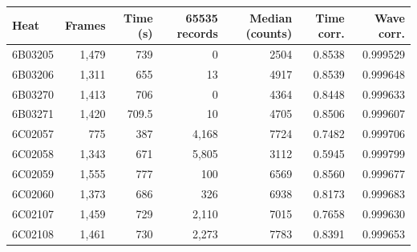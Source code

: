 \begingroup
{}
\begin{tabular}{lrrrrrr}
\toprule
Heat & Frames & Time (s) & 65535 records & Median (counts) & Time corr. & Wave corr. \\
\midrule
6B03205 & 1,479 & 739 & 0 & 2504 & 0.8538 & 0.999529 \\
6B03206 & 1,311 & 655 & 13 & 4917 & 0.8539 & 0.999648 \\
6B03270 & 1,413 & 706 & 0 & 4364 & 0.8448 & 0.999633 \\
6B03271 & 1,420 & 709.5 & 10 & 4705 & 0.8506 & 0.999607 \\
6C02057 & 775 & 387 & 4,168 & 7724 & 0.7482 & 0.999706 \\
6C02058 & 1,343 & 671 & 5,805 & 3112 & 0.5945 & 0.999799 \\
6C02059 & 1,555 & 777 & 100 & 6569 & 0.8560 & 0.999677 \\
6C02060 & 1,373 & 686 & 326 & 6938 & 0.8173 & 0.999683 \\
6C02107 & 1,459 & 729 & 2,110 & 7015 & 0.7658 & 0.999630 \\
6C02108 & 1,461 & 730 & 2,273 & 7783 & 0.8391 & 0.999653 \\
\bottomrule
\end{tabular}
\endgroup
